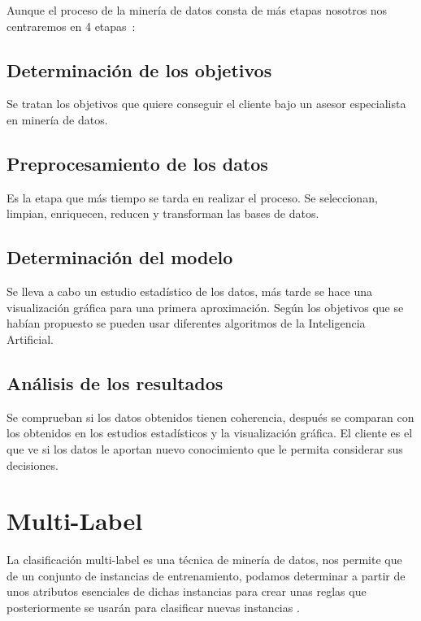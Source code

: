 Aunque el proceso de la minería de datos consta de más etapas nosotros nos centraremos en 4 etapas~\cite{datamining}:

\subsection{Determinación de los objetivos}

Se tratan los objetivos que quiere conseguir el cliente bajo un asesor especialista en minería de datos.

\subsection{Preprocesamiento de los datos}
	
Es la etapa que más tiempo se tarda en realizar el proceso. Se seleccionan, limpian, enriquecen, reducen y transforman las bases de datos.

\subsection{Determinación del modelo}

Se lleva a cabo un estudio estadístico de los datos, más tarde se hace una visualización gráfica para una primera aproximación. Según los objetivos que se habían propuesto se pueden usar diferentes algoritmos de la Inteligencia Artificial.

\subsection{Análisis de los resultados}	

Se comprueban si los datos obtenidos tienen coherencia, después se comparan con los obtenidos en los estudios estadísticos y la visualización gráfica. El cliente es el que ve si los datos le aportan nuevo conocimiento que le permita considerar sus decisiones.

\section{Multi-Label}
La clasificación multi-label es una técnica de minería de datos, nos permite que de un conjunto de instancias de entrenamiento, podamos determinar a partir de unos atributos esenciales de dichas instancias para crear unas reglas que posteriormente se usarán para clasificar nuevas instancias \cite{multilabel}.    

